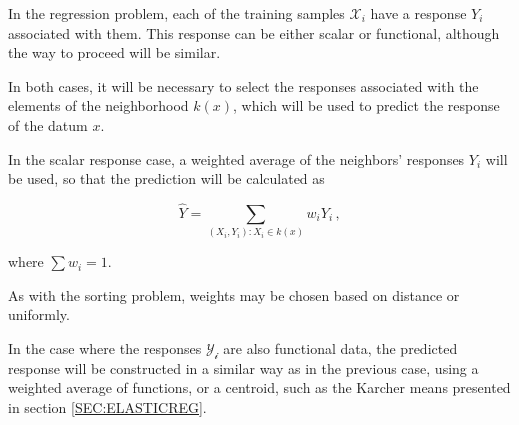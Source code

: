 In the regression problem, each of the training samples $\mathcal{X}_i$ have a
response $Y_i$ associated with them. This response can be either scalar or
functional, although the way to proceed will be similar.

In both cases, it will be necessary to select the responses associated with the
elements of the neighborhood $k(x)$, which will be used to predict the response
of the datum $x$.

In the scalar response case, a weighted average of the neighbors’ responses
$Y_i$ will be used, so that  the prediction will be calculated as

$$
\hat Y = \sum_{(X_i, Y_i) : X_i \in k(x)} w_i Y_i \, ,
$$

where $\sum w_i = 1$.

As with the sorting problem, weights may be chosen based on distance or
uniformly.

In the case where the responses $\mathcal{Y_i}$ are also functional data,
the predicted response will be constructed in a similar way as in the previous
case, using a weighted average of functions, or a centroid, such as the
Karcher means presented in section \ref{SEC:ELASTICREG}.
